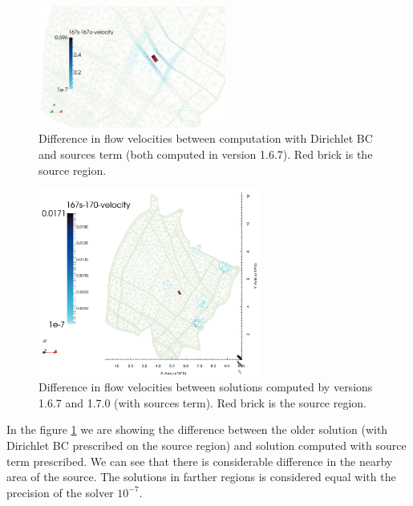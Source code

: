 \begin{figure}[!h]
        \centering
        \includegraphics[width=0.55\textwidth]{tests_graphics/mel_167s-167_velocity.pdf}
        \caption{Difference in flow velocities between computation with Dirichlet BC and sources term (both computed in version 1.6.7). 
                 Red brick is the source region.}
        \label{fig:bench_mel1}
\end{figure}
%
\begin{figure}[!h]
        \centering
        \includegraphics[width=0.65\textwidth]{tests_graphics/mel_167s-170_velocity.pdf}
        \caption{Difference in flow velocities between solutions computed by versions 1.6.7 and 1.7.0 (with sources term).
                 Red brick is the source region.}
        \label{fig:bench_mel2}
\end{figure}

In the figure \ref{fig:bench_mel1} we are showing the difference between the older solution (with Dirichlet BC prescribed on the source region) and 
solution computed with source term prescribed. We can see that there is considerable difference in the nearby area of the source. The solutions in farther 
regions is considered equal with the precision of the solver $10^{-7}$.


